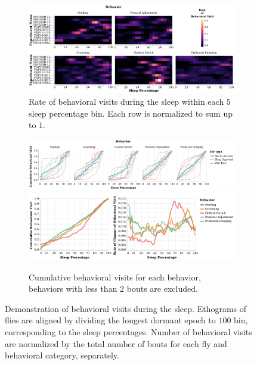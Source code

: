 \begin{figure}[htb!]
	\centering
	\begin{subfigure}[b]{0.975\linewidth}
		\centering\includegraphics[width=\linewidth]{figures/Heatmap_BehavioralUsage-Ann.pdf}
		\caption{Rate of behavioral visits during the sleep within each $5$ sleep percentage bin. Each row is normalized to sum up to $1$.}
	\end{subfigure}%

	\centering
	\begin{subfigure}[b]{0.975\linewidth}
		\centering\includegraphics[width=\linewidth]{figures/CumulativeLine_BehavioralUsage-Ann.pdf}
		\centering\includegraphics[width=\linewidth]{figures/MeanCumRofC_BehavioralUsage-Ann.pdf}
		\caption{Cumulative behavioral visits for each behavior, behaviors with less than 2 bouts are excluded.}
	\end{subfigure}%

	\caption[Demonstration of behavioral visits during the sleep.]{Demonstration of behavioral visits during the sleep.
		Ethograms of flies are aligned by dividing the longest dormant epoch to $100$ bin, corresponding to the sleep percentages.
		Number of behavioral visits are normalized by the total number of bouts for each fly and behavioral category, separately. \label{figure:temporal-organization-behavior}}

\end{figure}

